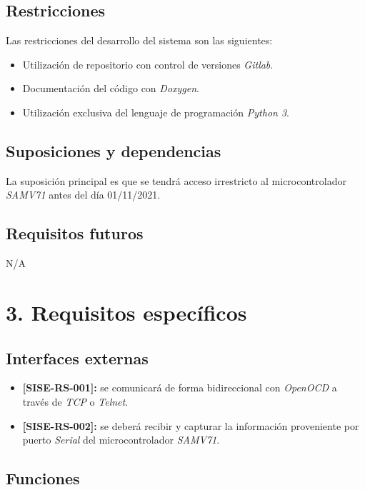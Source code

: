 \documentclass[
11pt, %
codirector, %
]{charter}
\def\codigo{SISE-RS}
\newcommand{\req}[1]{\textbf{[\codigo-#1]:}}
\begin{document}
\subsection{Restricciones}
\label{sub:restricciones}

Las restricciones del desarrollo del sistema son las siguientes:

\begin{itemize}
	\item Utilización de repositorio con control de versiones \emph{Gitlab}.
	\item Documentación del código con \emph{Doxygen}.
	\item Utilización exclusiva del lenguaje de programación \emph{Python 3}.
\end{itemize}

\subsection{Suposiciones y dependencias}
\label{sub:suposiciones}

La suposición principal es que se tendrá acceso irrestricto al microcontrolador \emph{SAMV71} antes del día 01/11/2021.

\subsection{Requisitos futuros}
\label{sub:futuro}

N/A

\newpage
\section{3. Requisitos específicos}
\label{sec:requisitos}


\subsection{Interfaces externas}
\label{sub:interfaces}

\begin{itemize}
	\item \req{001} se comunicará de forma bidireccional con \emph{OpenOCD} a través de \emph{TCP} o \emph{Telnet}.
	\item \req{002} se deberá recibir y capturar la información proveniente por puerto \emph{Serial} del microcontrolador \emph{SAMV71}.
\end{itemize}

\subsection{Funciones}
\label{sub:funciones}
\end{document}
